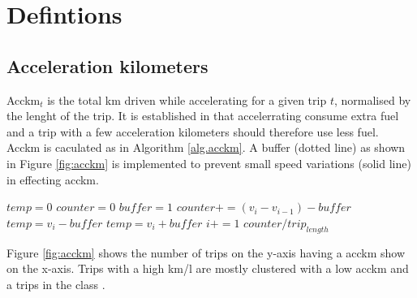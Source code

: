 \section{Defintions}

\subsection{Acceleration kilometers}
Acckm$_t$ is the total km driven while accelerating for a given trip $t$, normalised by the lenght of the trip. 
It is established in \cite{EcoMark} that accelerrating consume extra fuel and a trip with a few acceleration kilometers should therefore use less fuel.  
Acckm is caculated as in Algorithm \ref{alg.acckm}. 
A buffer (dotted line) as shown in Figure \ref{fig:acckm} is implemented to prevent small speed variations (solid line) in effecting acckm.

\begin{algorithm}
\caption{$acckm$}\label{alg.acckm}
\begin{algorithmic}[1]
\State $temp = 0$
\State $counter = 0$
\State $buffer = 1$ %
	\State $counter += (v_i - v_{i-1}) - buffer$
	\State $temp = v_i - buffer$
	\State $temp = v_i + buffer$
\EndIf
\State $i+=1$
\EndWhile
\State \Return $ counter / trip_{length}$

\end{algorithmic}
\end{algorithm}

Figure \ref{fig:acckm} shows the number of trips on the y-axis having a acckm show on the x-axis. 
Trips with a high km/l are mostly clustered with a low acckm and a trips in the \fuelMedium class . 

